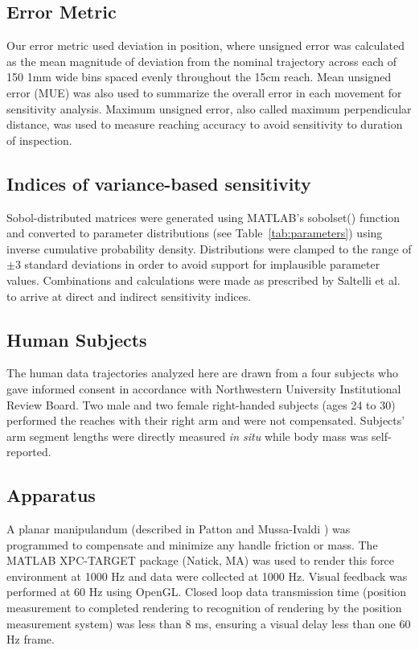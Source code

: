 \documentclass[10pt]{article}
\begin{document}
\subsection*{Error Metric}
Our error metric used deviation in position, where unsigned error was calculated as the mean magnitude of deviation from the nominal trajectory across each of 150 1mm wide bins spaced evenly throughout the 15cm reach.  Mean unsigned error (MUE) was also used to summarize the overall error in each movement for sensitivity analysis. Maximum unsigned error, also called maximum perpendicular distance, was used to measure reaching accuracy to avoid sensitivity to duration of inspection.

\subsection*{Indices of variance-based sensitivity}
Sobol-distributed matrices were generated using MATLAB's sobolset() function and converted to parameter distributions (see Table~\ref{tab:parameters}) using inverse cumulative probability density. Distributions were clamped to the range of $\pm3$ standard deviations in order to avoid support for implausible parameter values. Combinations and calculations were made as prescribed by Saltelli et al. \cite{saltelli2010variance} to arrive at direct and indirect sensitivity indices.

\subsection*{Human Subjects}
The human data trajectories analyzed here are drawn from a four subjects who gave informed consent in accordance with Northwestern University Institutional Review Board. Two male and two female right-handed subjects (ages 24 to 30) performed the reaches with their right arm and were not compensated. Subjects' arm segment lengths were directly measured \textit{in situ} while body mass was self-reported.

\subsection*{Apparatus}
A planar manipulandum (described in Patton and Mussa-Ivaldi \cite{patton2004robot}) was programmed to compensate and minimize any handle friction or mass. The MATLAB XPC-TARGET package (Natick, MA) was used to render this force environment at 1000 Hz and data were collected at 1000 Hz.  Visual feedback was performed at 60 Hz using OpenGL. Closed loop data transmission time (position measurement to completed rendering to recognition of rendering by the position measurement system) was less than 8 ms, ensuring a visual delay less than one 60 Hz frame.
\end{document}
